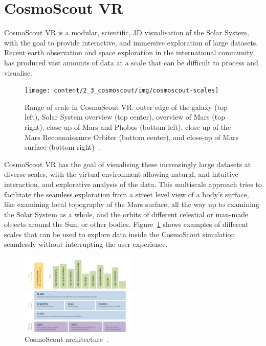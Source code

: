 \section{CosmoScout VR}\label{sec:cosmoscout-vr}

CosmoScout VR is a modular, scientific, 3D visualisation of the Solar System, with the goal to provide interactive,
and immersive exploration of large datasets.
Recent earth observation and space exploration in the international community has produced vast amounts of data at a
scale that can be difficult to process and visualise.

\begin{figure}[h]
    \centering
    \texttt{[image: content/2\_3\_cosmoscout/img/cosmoscout-scales]}
    \caption{Range of scale in CosmoScout VR: outer edge of the galaxy (top left), Solar System overview (top center),
        overview of Mars (top right), close-up of Mars and Phobos (bottom left), close-up of the Mars Reconnaissance
        Orbiter (bottom center), and close-up of Mars surface (bottom right)~\cite{DLRmagazin2019}.}
    \label{fig:cosmoscout-scales}
\end{figure}

CosmoScout VR has the goal of visualising these increasingly large datasets at diverse scales, with the virtual
environment allowing natural, and intuitive interaction, and explorative analysis of the data.
This multiscale approach tries to facilitate the seamless exploration from a street level view of a body's surface,
like examining local topography of the Mars surface, all the way up to examining the
Solar System as a whole, and the orbits of different celestial or man-made objects around the Sun, or other bodies.
Figure~\ref{fig:cosmoscout-scales} shows examples of different scales that can be used to explore data inside the
CosmoScout simulation seamlessly without interrupting the user experience.

\begin{figure}
    \centering
    \includegraphics[width=0.5\textwidth]{content/2_3_cosmoscout/img/cosmoscout-architecture}
    \caption{CosmoScout architecture~\cite{CSVR}.}
    \label{fig:cosmoscout-architecture}
\end{figure}


